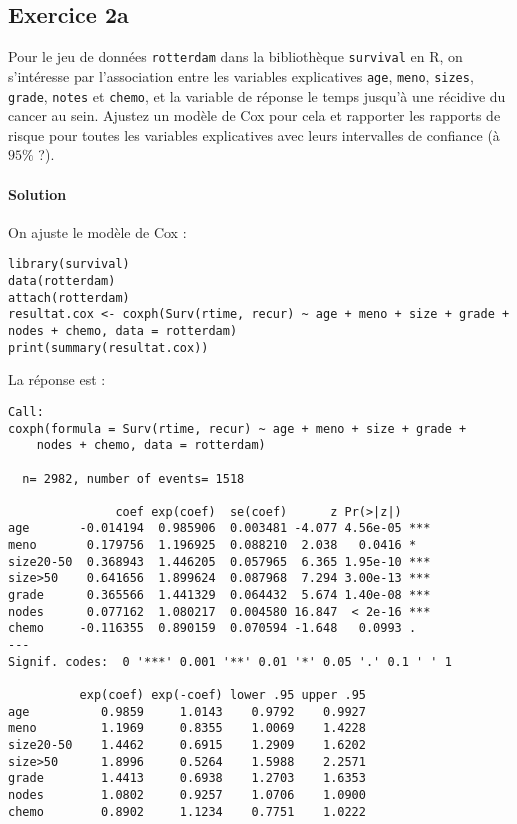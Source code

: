 \documentclass[../main.tex]{subfiles}
\begin{document}
\begin{CJK*}{UTF8}{gbsn}
\section*{Exercice 2a}
Pour le jeu de données 
\texttt{rotterdam} dans la bibliothèque \texttt{survival} en R, 
on s'intéresse par l'association entre les variables explicatives \texttt{age}, \texttt{meno}, 
\texttt{sizes}, \texttt{grade}, \texttt{notes} et \texttt{chemo},
et la variable de réponse le temps jusqu'à une récidive du cancer au sein.
Ajustez un modèle de Cox pour cela et rapporter 
les rapports de risque pour toutes les variables explicatives avec leurs intervalles de confiance (à $95\%$ ?).

\paragraph{Solution}

On ajuste le modèle de Cox :

\begin{lstlisting}
library(survival)
data(rotterdam)
attach(rotterdam)
resultat.cox <- coxph(Surv(rtime, recur) ~ age + meno + size + grade + nodes + chemo, data = rotterdam)
print(summary(resultat.cox))
\end{lstlisting}

La réponse est :

\begin{lstlisting}
Call:
coxph(formula = Surv(rtime, recur) ~ age + meno + size + grade + 
    nodes + chemo, data = rotterdam)

  n= 2982, number of events= 1518 

               coef exp(coef)  se(coef)      z Pr(>|z|)    
age       -0.014194  0.985906  0.003481 -4.077 4.56e-05 ***
meno       0.179756  1.196925  0.088210  2.038   0.0416 *  
size20-50  0.368943  1.446205  0.057965  6.365 1.95e-10 ***
size>50    0.641656  1.899624  0.087968  7.294 3.00e-13 ***
grade      0.365566  1.441329  0.064432  5.674 1.40e-08 ***
nodes      0.077162  1.080217  0.004580 16.847  < 2e-16 ***
chemo     -0.116355  0.890159  0.070594 -1.648   0.0993 .  
---
Signif. codes:  0 '***' 0.001 '**' 0.01 '*' 0.05 '.' 0.1 ' ' 1

          exp(coef) exp(-coef) lower .95 upper .95
age          0.9859     1.0143    0.9792    0.9927
meno         1.1969     0.8355    1.0069    1.4228
size20-50    1.4462     0.6915    1.2909    1.6202
size>50      1.8996     0.5264    1.5988    2.2571
grade        1.4413     0.6938    1.2703    1.6353
nodes        1.0802     0.9257    1.0706    1.0900
chemo        0.8902     1.1234    0.7751    1.0222


\end{lstlisting}
\end{CJK*}
\end{document}
